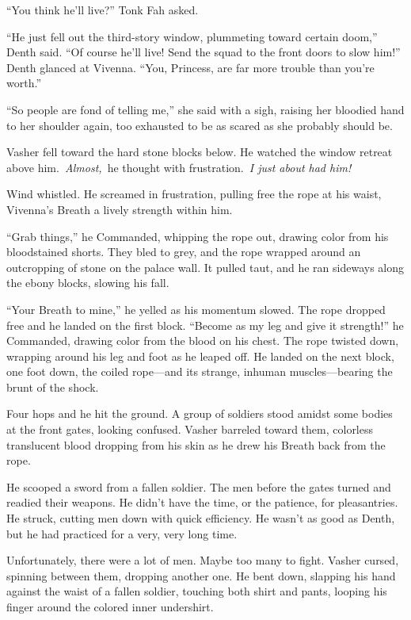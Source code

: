 “You think he’ll live?” Tonk Fah asked.

“He just fell out the third-story window, plummeting toward certain doom,” Denth said. “Of course he’ll live! Send the squad to the front doors to slow him!” Denth glanced at Vivenna. “You, Princess, are far more trouble than you’re worth.”

“So people are fond of telling me,” she said with a sigh, raising her bloodied hand to her shoulder again, too exhausted to be as scared as she probably should be.

\orn

Vasher fell toward the hard stone blocks below. He watched the window retreat above him.~\textit{Almost,}~he thought with frustration.~\textit{I just about had him!}

Wind whistled. He screamed in frustration, pulling free the rope at his waist, Vivenna’s Breath a lively strength within him.

“Grab things,” he Commanded, whipping the rope out, drawing color from his bloodstained shorts. They bled to grey, and the rope wrapped around an outcropping of stone on the palace wall. It pulled taut, and he ran sideways along the ebony blocks, slowing his fall.

“Your Breath to mine,” he yelled as his momentum slowed. The rope dropped free and he landed on the first block. “Become as my leg and give it strength!” he Commanded, drawing color from the blood on his chest. The rope twisted down, wrapping around his leg and foot as he leaped off. He landed on the next block, one foot down, the coiled rope—and its strange, inhuman muscles—bearing the brunt of the shock.

Four hops and he hit the ground. A group of soldiers stood amidst some bodies at the front gates, looking confused. Vasher barreled toward them, colorless translucent blood dropping from his skin as he drew his Breath back from the rope.

He scooped a sword from a fallen soldier. The men before the gates turned and readied their weapons. He didn’t have the time, or the patience, for pleasantries. He struck, cutting men down with quick efficiency. He wasn’t as good as Denth, but he had practiced for a very, very long time.

Unfortunately, there were a lot of men. Maybe too many to fight. Vasher cursed, spinning between them, dropping another one. He bent down, slapping his hand against the waist of a fallen soldier, touching both shirt and pants, looping his finger around the colored inner undershirt.

